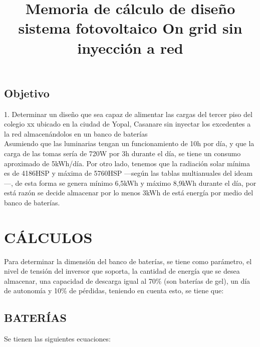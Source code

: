 \documentclass[journal]{IEEEtran}
\begin{document}
\title{Memoria de cálculo de diseño sistema fotovoltaico On grid sin inyección a red}
\maketitle

\IEEEpeerreviewmaketitle


\subsection*{Objetivo}
1. Determinar un diseño que sea capaz de alimentar las cargas del tercer piso del colegio xx ubicado en la ciudad de Yopal, Casanare sin inyectar los excedentes a la red almacenándolos en un banco de baterías\\

Asumiendo que las luminarias tengan un funcionamiento de 10h por día, y que la carga de las tomas sería de 720W por 3h durante el día, se tiene un consumo aproximado de 5kWh/día. Por otro lado, tenemos que la radiación solar mínima es de 4186HSP y máxima de 5760HSP ---según las tablas multianuales del ideam---, de esta forma se genera mínimo 6,5kWh y máximo 8,9kWh durante el día, por está razón se decide almacenar por lo menos 3kWh de está energía por medio del banco de baterías.




\section*{CÁLCULOS}
Para determinar la dimensión del banco de baterías, se tiene como parámetro, el nivel de tensión del inversor que soporta, la cantidad de energía que se desea almacenar, una capacidad de descarga igual al 70\% (son baterías de gel), un día de autonomía y 10\% de pérdidas, teniendo en cuenta esto, se tiene que:
\subsection*{BATERÍAS}
Se tienen las siguientes ecuaciones:
\end{document}
